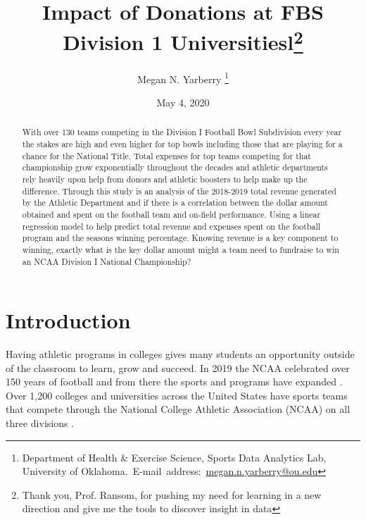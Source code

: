 \documentclass[12pt,english]{article}
\begin{document}
\begin{singlespace}
\title{Impact of Donations at FBS Division 1 Universitiesl\thanks{Thank you, Prof. Ransom, for pushing my need for learning in a new direction and give me the tools to discover insight in data}}
\end{singlespace}

\author{Megan N. Yarberry \thanks{Department of Health \& Exercise Science, Sports Data Analytics Lab, University of Oklahoma.\
E-mail~address:~\href{mailto:megan.n.yarberry@ou.edu}{megan.n.yarberry@ou.edu}}}

\date{May 4, 2020}

\maketitle

\begin{abstract}
\begin{singlespace}
With over 130 teams competing in the Division I Football Bowl Subdivision every year the stakes are high and even higher for top bowls including those that are playing for a chance for the National Title. Total expenses for top teams competing for that championship grow exponentially throughout the decades and athletic departments rely heavily upon help from donors and athletic boosters to help make up the difference. Through this study is an analysis of the 2018-2019 total revenue generated by the Athletic Department and if there is a correlation between the dollar amount obtained and spent on the football team and on-field performance. Using a linear regression model to help predict total revenue and expenses spent on the football program and the seasons winning percentage. Knowing revenue is a key component to winning, exactly what is the key dollar amount might a team need to fundraise to win an NCAA Division I National Championship? 
\end{singlespace}

\end{abstract}
\vfill{}



\pagebreak{}


\section{Introduction}\label{sec:intro}
Having athletic programs in colleges gives many students an opportunity outside of the classroom to learn, grow and succeed. In 2019 the NCAA celebrated over 150 years of football and from there the sports and programs have expanded \citep{Parlier}. Over 1,200 colleges and universities across the United States have sports teams that compete through the National College Athletic Association (NCAA) on all three divisions \citep{Ncaa_2019}. 
\end{document}
